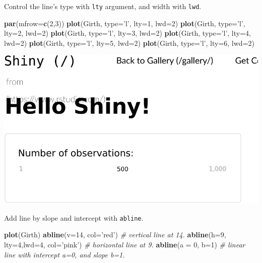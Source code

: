\documentclass[]{book}
\newenvironment{Shaded}{\begin{snugshade}}{\end{snugshade}}
\newcommand{\CommentTok}[1]{\textcolor[rgb]{0.56,0.35,0.01}{\textit{#1}}}
\newcommand{\DataTypeTok}[1]{\textcolor[rgb]{0.13,0.29,0.53}{#1}}
\newcommand{\DecValTok}[1]{\textcolor[rgb]{0.00,0.00,0.81}{#1}}
\newcommand{\KeywordTok}[1]{\textcolor[rgb]{0.13,0.29,0.53}{\textbf{#1}}}
\newcommand{\NormalTok}[1]{#1}
\newcommand{\StringTok}[1]{\textcolor[rgb]{0.31,0.60,0.02}{#1}}
\theoremstyle{definition}
\theoremstyle{definition}
\theoremstyle{definition}
\theoremstyle{remark}
\begin{document}
Control the line's type with \texttt{lty} argument, and width with \texttt{lwd}.

\begin{Shaded}
\begin{Highlighting}[]
\KeywordTok{par}\NormalTok{(}\DataTypeTok{mfrow=}\KeywordTok{c}\NormalTok{(}\DecValTok{2}\NormalTok{,}\DecValTok{3}\NormalTok{))}
\KeywordTok{plot}\NormalTok{(Girth, }\DataTypeTok{type=}\StringTok{'l'}\NormalTok{, }\DataTypeTok{lty=}\DecValTok{1}\NormalTok{, }\DataTypeTok{lwd=}\DecValTok{2}\NormalTok{)}
\KeywordTok{plot}\NormalTok{(Girth, }\DataTypeTok{type=}\StringTok{'l'}\NormalTok{, }\DataTypeTok{lty=}\DecValTok{2}\NormalTok{, }\DataTypeTok{lwd=}\DecValTok{2}\NormalTok{)}
\KeywordTok{plot}\NormalTok{(Girth, }\DataTypeTok{type=}\StringTok{'l'}\NormalTok{, }\DataTypeTok{lty=}\DecValTok{3}\NormalTok{, }\DataTypeTok{lwd=}\DecValTok{2}\NormalTok{)}
\KeywordTok{plot}\NormalTok{(Girth, }\DataTypeTok{type=}\StringTok{'l'}\NormalTok{, }\DataTypeTok{lty=}\DecValTok{4}\NormalTok{, }\DataTypeTok{lwd=}\DecValTok{2}\NormalTok{)}
\KeywordTok{plot}\NormalTok{(Girth, }\DataTypeTok{type=}\StringTok{'l'}\NormalTok{, }\DataTypeTok{lty=}\DecValTok{5}\NormalTok{, }\DataTypeTok{lwd=}\DecValTok{2}\NormalTok{)}
\KeywordTok{plot}\NormalTok{(Girth, }\DataTypeTok{type=}\StringTok{'l'}\NormalTok{, }\DataTypeTok{lty=}\DecValTok{6}\NormalTok{, }\DataTypeTok{lwd=}\DecValTok{2}\NormalTok{)}
\end{Highlighting}
\end{Shaded}

\includegraphics[width=0.5\linewidth]{Rcourse_files/figure-latex/unnamed-chunk-254-1}

Add line by slope and intercept with \texttt{abline}.

\begin{Shaded}
\begin{Highlighting}[]
\KeywordTok{plot}\NormalTok{(Girth)}
\KeywordTok{abline}\NormalTok{(}\DataTypeTok{v=}\DecValTok{14}\NormalTok{, }\DataTypeTok{col=}\StringTok{'red'}\NormalTok{) }\CommentTok{# vertical line at 14.}
\KeywordTok{abline}\NormalTok{(}\DataTypeTok{h=}\DecValTok{9}\NormalTok{, }\DataTypeTok{lty=}\DecValTok{4}\NormalTok{,}\DataTypeTok{lwd=}\DecValTok{4}\NormalTok{, }\DataTypeTok{col=}\StringTok{'pink'}\NormalTok{) }\CommentTok{# horizontal line at 9.}
\KeywordTok{abline}\NormalTok{(}\DataTypeTok{a =} \DecValTok{0}\NormalTok{, }\DataTypeTok{b=}\DecValTok{1}\NormalTok{) }\CommentTok{# linear line with intercept a=0, and slope b=1.}
\end{Highlighting}
\end{Shaded}
\end{document}

